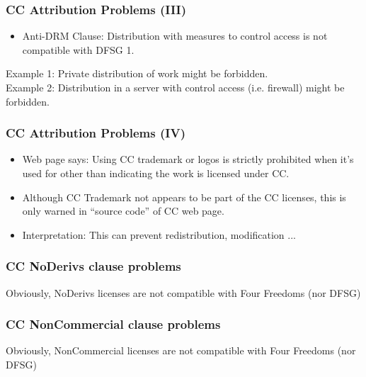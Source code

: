 \begin{frame}
\frametitle{CC Attribution Problems (III)}

\begin{itemize}
\item Anti-DRM Clause: Distribution with measures to control access is not compatible with DFSG 1.
\end{itemize}

Example 1: Private distribution of work might be forbidden.\\
Example 2: Distribution in a server with control access (i.e. firewall) might be forbidden.
\end{frame}


\begin{frame}
\frametitle{CC Attribution Problems (IV)}

\begin{itemize}
\item Web page says: Using CC trademark or logos is strictly prohibited when it's used for other than indicating the work is licensed under CC.
\item Although CC Trademark not appears to be part of the CC licenses, this is only warned in ``source code'' of CC web page.
\item Interpretation: This can prevent redistribution, modification ...
\end{itemize}

\end{frame}


\begin{frame}
\frametitle{CC NoDerivs clause problems}

\LARGE{Obviously, NoDerivs licenses are not compatible with Four Freedoms (nor DFSG)}

\end{frame}


\begin{frame}
\frametitle{CC NonCommercial clause problems}

\LARGE{Obviously, NonCommercial licenses are not compatible with Four Freedoms (nor DFSG)}

\end{frame}

